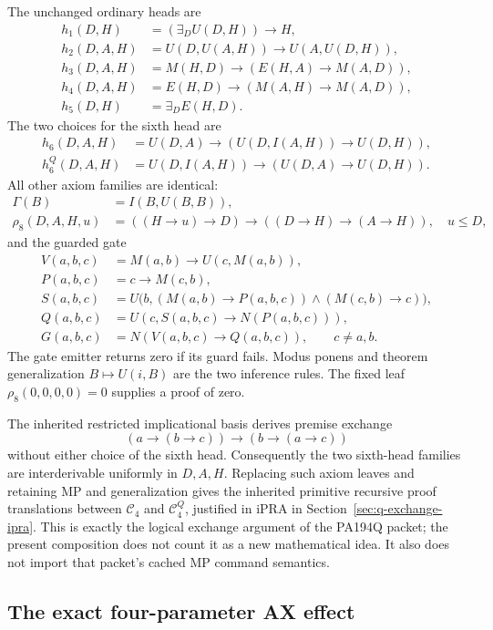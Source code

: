 The unchanged ordinary heads are
\begin{align*}
 h_1(D,H)&=(\exists_D U(D,H))\to H,\\
 h_2(D,A,H)&=U(D,U(A,H))\to U(A,U(D,H)),\\
 h_3(D,A,H)&=M(H,D)\to(E(H,A)\to M(A,D)),\\
 h_4(D,A,H)&=E(H,D)\to(M(A,H)\to M(A,D)),\\
 h_5(D,H)&=\exists_D E(H,D).
\end{align*}
The two choices for the sixth head are
\begin{align*}
 h_6(D,A,H)&=U(D,A)\to(U(D,I(A,H))\to U(D,H)),\\
 h_6^Q(D,A,H)&=U(D,I(A,H))\to(U(D,A)\to U(D,H)).
\end{align*}
All other axiom families are identical:
\begin{align*}
 \Gamma(B)&=I(B,U(B,B)),\\
 \rho_8(D,A,H,u)&=((H\to u)\to D)\to((D\to H)\to(A\to H)),
 \quad u\leq D,
\end{align*}
and the guarded gate
\begin{align*}
 V(a,b,c)&=M(a,b)\to U(c,M(a,b)),\\
 P(a,b,c)&=c\to M(c,b),\\
 S(a,b,c)&=U\bigl(b,(M(a,b)\to P(a,b,c))\wedge(M(c,b)\to c)\bigr),\\
 Q(a,b,c)&=U(c,S(a,b,c)\to N(P(a,b,c))),\\
 G(a,b,c)&=N(V(a,b,c)\to Q(a,b,c)),\qquad c\ne a,b.
\end{align*}
The gate emitter returns zero if its guard fails. Modus ponens and
theorem generalization $B\mapsto U(i,B)$ are the two inference rules.
The fixed leaf $\rho_8(0,0,0,0)=0$ supplies a proof of zero.

The inherited restricted implicational basis derives premise exchange
\[
 (a\to(b\to c))\to(b\to(a\to c))
\]
without either choice of the sixth head. Consequently the two sixth-head
families are interderivable uniformly in $D,A,H$. Replacing such axiom
leaves and retaining MP and generalization gives the inherited
primitive recursive proof translations between
$\mathcal C_4$ and $\mathcal C_4^Q$, justified in iPRA in
Section~\ref{sec:q-exchange-ipra}. This is exactly the logical exchange
argument of the PA194Q packet; the present composition does not count it
as a new mathematical idea. It also does not import that packet's cached
MP command semantics.

\subsection{The exact four-parameter AX effect}

